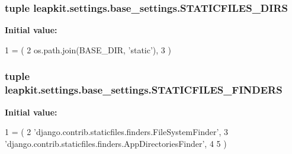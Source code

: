 \hypertarget{namespaceleapkit_1_1settings_1_1base__settings_a28ba17345c6505827a06c8a6ce46a2dd}{
\subsubsection[{S\-T\-A\-T\-I\-C\-F\-I\-L\-E\-S\-\_\-\-D\-I\-R\-S}]{\setlength{\rightskip}{0pt plus 5cm}tuple leapkit.\-settings.\-base\-\_\-settings.\-S\-T\-A\-T\-I\-C\-F\-I\-L\-E\-S\-\_\-\-D\-I\-R\-S}}\label{namespaceleapkit_1_1settings_1_1base__settings_a28ba17345c6505827a06c8a6ce46a2dd}
{\bfseries Initial value\-:}
\begin{DoxyCode}
1 = (
2     os.path.join(BASE\_DIR, \textcolor{stringliteral}{'static'}),
3 )
\end{DoxyCode}
\hypertarget{namespaceleapkit_1_1settings_1_1base__settings_a3336faac53d35ac15b7315bfe0b7af71}{
\subsubsection[{S\-T\-A\-T\-I\-C\-F\-I\-L\-E\-S\-\_\-\-F\-I\-N\-D\-E\-R\-S}]{\setlength{\rightskip}{0pt plus 5cm}tuple leapkit.\-settings.\-base\-\_\-settings.\-S\-T\-A\-T\-I\-C\-F\-I\-L\-E\-S\-\_\-\-F\-I\-N\-D\-E\-R\-S}}\label{namespaceleapkit_1_1settings_1_1base__settings_a3336faac53d35ac15b7315bfe0b7af71}
{\bfseries Initial value\-:}
\begin{DoxyCode}
1 = (
2     \textcolor{stringliteral}{'django.contrib.staticfiles.finders.FileSystemFinder'},
3     \textcolor{stringliteral}{'django.contrib.staticfiles.finders.AppDirectoriesFinder'},
4 
5 )
\end{DoxyCode}
